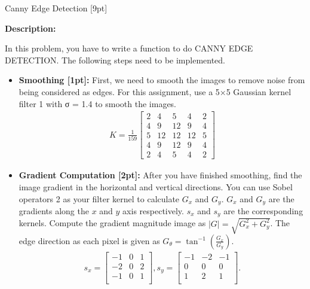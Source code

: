 \documentclass{assignment}
\begin{document}
\begin{problemlist}
\newpage
\pbitem Canny Edge Detection [9pt]

\textbf{Description:}

In this problem, you have to write a function to do CANNY EDGE DETECTION. The following steps need to be implemented.
\begin{itemize}
    \item\textbf{Smoothing [1pt]:} First, we need to smooth the images to remove noise from being considered as edges. For this assignment, use a 5$\times$5 Gaussian kernel filter 1 with σ = 1.4 to smooth the images.\\
    \begin{align}
        K = \frac{1}{159}
        \begin{bmatrix}
        2&4&5&4&2\\
        4&9&12&9&4\\
        5&12&12&12&5\\
        4&9&12&9&4\\
        2&4&5&4&2
        \end{bmatrix}
    \end{align}
    
    \item\textbf{Gradient Computation [2pt]:}
    After you have finished smoothing, find the image gradient in the horizontal and vertical directions. You can use Sobel operators 2 as your filter kernel to calculate $G_x$ and $G_y$. $G_x$ and $G_y$ are the gradients along the $x$ and $y$ axis respectively. $s_x$ and $s_y$ are the corresponding kernels. Compute the gradient magnitude image as $|G| = \sqrt{G^{2}_x + G^{2}_y}$. The edge direction as each pixel is given as $G_{\theta} = \tan^{-1}(\frac{G_x}{G_y}).$
    \begin{align}
        s_x =
        \begin{bmatrix}
        -1&0&1\\
        -2&0&2\\
        -1&0&1\\
        \end{bmatrix},
        s_y =
        \begin{bmatrix}
        -1&-2&-1\\
        0&0&0\\
        1&2&1\\
        \end{bmatrix}.
    \end{align}
    

\end{itemize}
\end{problemlist}
\end{document}
